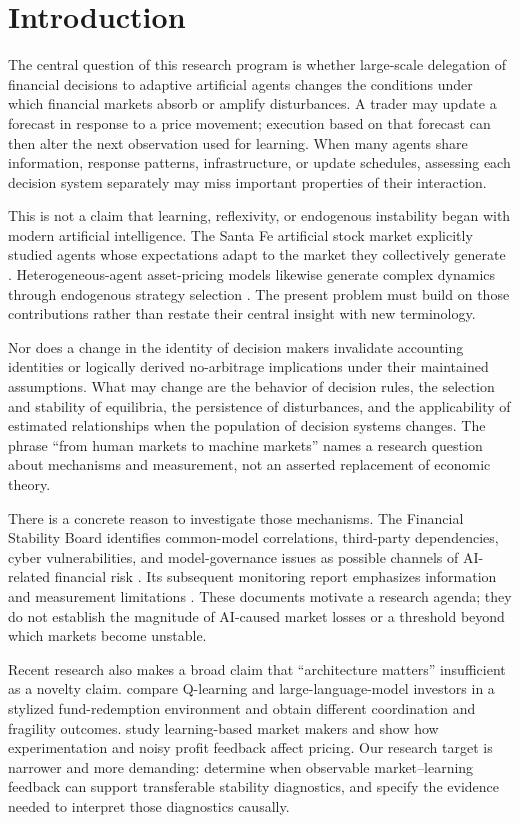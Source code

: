 \documentclass[11pt,a4paper]{article}
\theoremstyle{definition}
\theoremstyle{remark}
\begin{document}
\section{Introduction}
\label{sec:intro}
The central question of this research program is whether large-scale delegation of financial decisions to adaptive artificial agents changes the conditions under which financial markets absorb or amplify disturbances. A trader may update a forecast in response to a price movement; execution based on that forecast can then alter the next observation used for learning. When many agents share information, response patterns, infrastructure, or update schedules, assessing each decision system separately may miss important properties of their interaction.

This is not a claim that learning, reflexivity, or endogenous instability began with modern artificial intelligence. The Santa Fe artificial stock market explicitly studied agents whose expectations adapt to the market they collectively generate \citep{arthur1996}. Heterogeneous-agent asset-pricing models likewise generate complex dynamics through endogenous strategy selection \citep{brock1998}. The present problem must build on those contributions rather than restate their central insight with new terminology.

Nor does a change in the identity of decision makers invalidate accounting identities or logically derived no-arbitrage implications under their maintained assumptions. What may change are the behavior of decision rules, the selection and stability of equilibria, the persistence of disturbances, and the applicability of estimated relationships when the population of decision systems changes. The phrase ``from human markets to machine markets'' names a research question about mechanisms and measurement, not an asserted replacement of economic theory.

There is a concrete reason to investigate those mechanisms. The Financial Stability Board identifies common-model correlations, third-party dependencies, cyber vulnerabilities, and model-governance issues as possible channels of AI-related financial risk \citep{fsb2024}. Its subsequent monitoring report emphasizes information and measurement limitations \citep{fsb2025}. These documents motivate a research agenda; they do not establish the magnitude of AI-caused market losses or a threshold beyond which markets become unstable.

Recent research also makes a broad claim that ``architecture matters'' insufficient as a novelty claim. \citet{anand2026} compare Q-learning and large-language-model investors in a stylized fund-redemption environment and obtain different coordination and fragility outcomes. \citet{colliard2026} study learning-based market makers and show how experimentation and noisy profit feedback affect pricing. Our research target is narrower and more demanding: determine when observable market--learning feedback can support transferable stability diagnostics, and specify the evidence needed to interpret those diagnostics causally.
\end{document}
